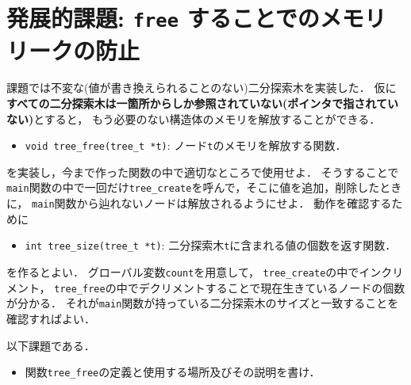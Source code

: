\documentclass[a4paper,twoside,onecolumn,openany,article]{memoir}
\theoremstyle{remark}
\begin{document}
\section{発展的課題: \texttt{free} することでのメモリリークの防止}
課題では不変な(値が書き換えられることのない)二分探索木を実装した．
仮に\textbf{すべての二分探索木は一箇所からしか参照されていない(ポインタで指されていない)}とすると，
もう必要のない構造体のメモリを解放することができる．
\begin{itemize}
\item \texttt{void tree\_free(tree\_t *t)}: ノード\texttt{t}のメモリを解放する関数．
\end{itemize}
を実装し，今まで作った関数の中で適切なところで使用せよ．
そうすることで\texttt{main}関数の中で一回だけ\texttt{tree\_create}を呼んで，そこに値を追加，削除したときに，
\texttt{main}関数から辿れないノードは解放されるようにせよ．
動作を確認するために
\begin{itemize}
\item \texttt{int tree\_size(tree\_t *t)}: 二分探索木\texttt{t}に含まれる値の個数を返す関数．
\end{itemize}
を作るとよい．
グローバル変数\texttt{count}を用意して，
\texttt{tree\_create}の中でインクリメント，
\texttt{tree\_free}の中でデクリメントすることで現在生きているノードの個数が分かる．
それが\texttt{main}関数が持っている二分探索木のサイズと一致することを確認すればよい．

以下課題である．
\begin{itemize}
\item 関数\texttt{tree\_free}の定義と使用する場所及びその説明を書け．
\end{itemize}
\end{document}
